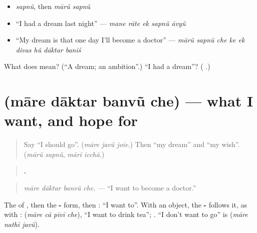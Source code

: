 \begin{itemize}
\raggedright
  \item \emph{sapnũ}, then \emph{mārũ sapnũ}
  \item \textquotedblleft{}I had a dream last night\textquotedblright{} — \emph{mane rāte ek sapnũ āvyũ}
  \item \textquotedblleft{}My dream is that one day I'll become a doctor\textquotedblright{} — \emph{mārũ sapnũ che ke ek divas hũ dāktar banīś}
\end{itemize}

\begin{tcolorbox}[breakable,colback=teal!4,colframe=teal!35!black,title={Before you move on}]
What does \textbf{} mean? (\textquotedblleft{}A dream; an ambition\textquotedblright{}.) \textquotedblleft{}I had a dream\textquotedblright{}? (\textbf{  }.)
\end{tcolorbox}
\section[\texorpdfstring{\gu{મારે} \gu{દાક્તર} \gu{બનવું} \gu{છે} (māre dāktar banvũ che)}{મારે દાક્તર બનવું છે (māre dāktar banvũ che)}]{    (māre dāktar banvũ che) — what I want, and hope for}

\label{lesson:GU-C281-banvu-che}



\begin{quote}
Say \textquotedblleft{}I should go\textquotedblright{}. (\emph{māre javũ joīe}.) Then \textquotedblleft{}my dream\textquotedblright{} and \textquotedblleft{}my wish\textquotedblright{}. (\emph{mārũ sapnũ}, \emph{mārī icchā}.)
\end{quote}

\begin{grammarlens}[title={Grammar Lens: \gu{મારે} … -\gu{વું} \gu{છે}}]
\begin{quote}
\textbf{   .}
\end{quote}

\begin{quote}
\emph{māre dāktar banvũ che.} — \textquotedblleft{}I want to become a doctor.\textquotedblright{}
\end{quote}

The \textbf{} of \textbf{  }, then the \textbf{-} form, then \textbf{}: \textquotedblleft{}I want to\textquotedblright{}. With an object, the \textbf{-} follows it, as with \textbf{}: \textbf{   } (\emph{māre cā pīvī che}), \textquotedblleft{}I want to drink tea\textquotedblright{}; \textbf{    }. \textquotedblleft{}I don't want to go\textquotedblright{} is \textbf{  } (\emph{māre nathī javũ}).
\end{grammarlens}

